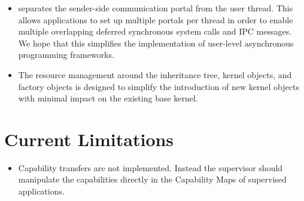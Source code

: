 \begin{itemize}
\item \mythos separates the sender-side communication portal from the user thread. This allows applications to set up multiple portals per thread in order to enable multiple overlapping deferred synchronous system calls and IPC messages. We hope that this simplifies the implementation of user-level asynchronous programming frameworks.
\item The resource management around the inheritance tree, kernel objects, and factory objects is designed to simplify the introduction of new kernel objects with minimal impact on the existing base kernel.
\end{itemize}


\section{Current Limitations}

\begin{itemize}
\item Capability transfers are not implemented. Instead the supervisor should manipulate the capabilities directly in the Capability Maps of supervised applications.
\end{itemize}
